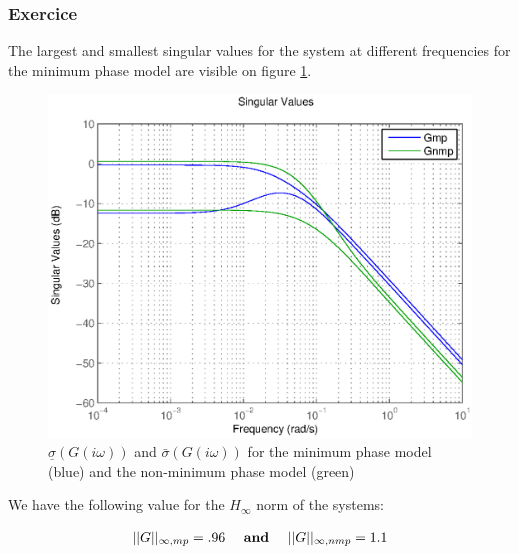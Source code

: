 \subsubsection{Exercice}
The largest and smallest singular values for the system at different frequencies for the minimum phase model are visible on figure \ref{singvalue}.

\begin{figure}[h!b]
    \includegraphics[width=\columnwidth]{fig/singvalue}
    \caption{$\underline{\sigma}(G(i\omega))$ and $\bar{\sigma}(G(i\omega))$ for the minimum phase model (blue) and the non-minimum phase model (green)}
    \label{singvalue}
\end{figure}

We have the following value for the $H_{\infty}$ norm of the systems:

$$\begin{array}{ccc}
    ||G||_{\infty,mp} =  .96
    & \text{ \textbf{and} } &
    ||G||_{\infty,nmp} = 1.1 
\end{array}
$$

